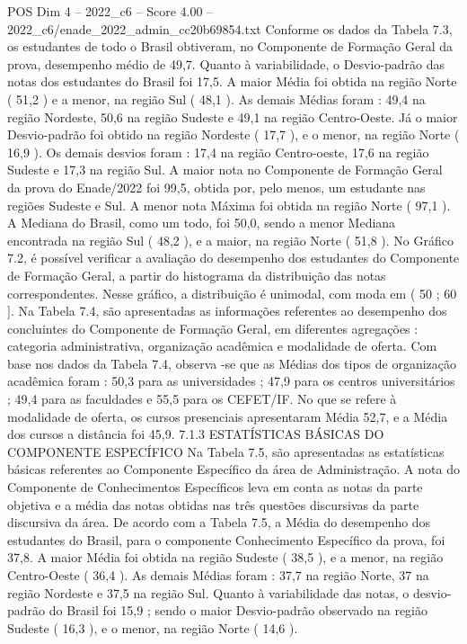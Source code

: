 \begin{textsample}{POS Dim 4 – 2022\_c6 – Score 4.00 – 2022\_c6/enade\_2022\_admin\_cc20b69854.txt}
Conforme os dados da Tabela 7.3, os estudantes de todo o Brasil obtiveram, no Componente de Formação Geral da prova, desempenho médio de 49,7.
Quanto à variabilidade, o Desvio-padrão das notas dos estudantes do Brasil foi 17,5.
A maior Média foi obtida na região Norte ( 51,2 ) e a menor, na região Sul ( 48,1 ).
As demais Médias foram : 49,4 na região Nordeste, 50,6 na região Sudeste e 49,1 na região Centro-Oeste.
Já o maior Desvio-padrão foi obtido na região Nordeste ( 17,7 ), e o menor, na região Norte ( 16,9 ).
Os demais desvios foram : 17,4 na região Centro-oeste, 17,6 na região Sudeste e 17,3 na região Sul.
A maior nota no Componente de Formação Geral da prova do Enade/2022 foi 99,5, obtida por, pelo menos, um estudante nas regiões Sudeste e Sul.
A menor nota Máxima foi obtida na região Norte ( 97,1 ).
A Mediana do Brasil, como um todo, foi 50,0, sendo a menor Mediana encontrada na região Sul ( 48,2 ), e a maior, na região Norte ( 51,8 ).
No Gráfico 7.2, é possível verificar a avaliação do desempenho dos estudantes do Componente de Formação Geral, a partir do histograma da distribuição das notas correspondentes.
Nesse gráfico, a distribuição é unimodal, com moda em ( 50 ; 60 ].
Na Tabela 7.4, são apresentadas as informações referentes ao desempenho dos concluintes do Componente de Formação Geral, em diferentes agregações : categoria administrativa, organização acadêmica e modalidade de oferta.
Com base nos dados da Tabela 7.4, observa -se que as Médias dos tipos de organização acadêmica foram : 50,3 para as universidades ; 47,9 para os centros universitários ; 49,4 para as faculdades e 55,5 para os CEFET/IF.
No que se refere à modalidade de oferta, os cursos presenciais apresentaram Média 52,7, e a Média dos cursos a distância foi 45,9. 7.1.3 ESTATÍSTICAS BÁSICAS DO COMPONENTE ESPECÍFICO Na Tabela 7.5, são apresentadas as estatísticas básicas referentes ao Componente Específico da área de Administração.
A nota do Componente de Conhecimentos Específicos leva em conta as notas da parte objetiva e a média das notas obtidas nas três questões discursivas da parte discursiva da área.
De acordo com a Tabela 7.5, a Média do desempenho dos estudantes do Brasil, para o componente Conhecimento Específico da prova, foi 37,8.
A maior Média foi obtida na região Sudeste ( 38,5 ), e a menor, na região Centro-Oeste ( 36,4 ).
As demais Médias foram : 37,7 na região Norte, 37 na região Nordeste e 37,5 na região Sul.
Quanto à variabilidade das notas, o desvio-padrão do Brasil foi 15,9 ; sendo o maior Desvio-padrão observado na região Sudeste ( 16,3 ), e o menor, na região Norte ( 14,6 ).

\end{textsample}
